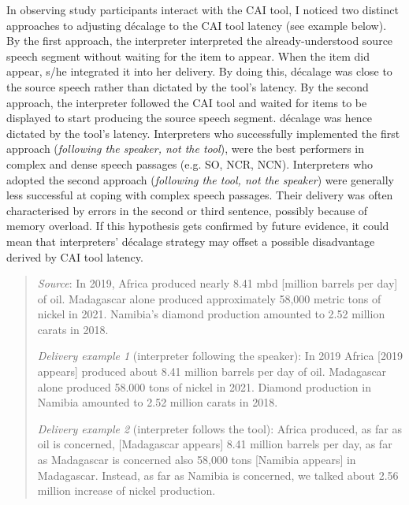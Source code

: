 In observing study participants interact with the CAI tool, I noticed two distinct approaches to adjusting décalage to the CAI tool latency (see example below). By the first approach, the interpreter interpreted the already-understood source speech segment without waiting for the item to appear. When the item did appear, s/he integrated it into her delivery. By doing this, décalage was close to the source speech rather than dictated by the tool’s latency. By the second approach, the interpreter followed the CAI tool and waited for items to be displayed to start producing the source speech segment. décalage was hence dictated by the tool’s latency. Interpreters who successfully implemented the first approach (\textit{following the speaker, not the tool}), were the best performers in complex and dense speech passages (e.g. SO, NCR, NCN). Interpreters who adopted the second approach (\textit{following the tool, not the speaker}) were generally less successful at coping with complex speech passages. Their delivery was often characterised by errors in the second or third sentence, possibly because of memory overload. If this hypothesis gets confirmed by future evidence, it could mean that interpreters’ décalage strategy may offset a possible disadvantage derived by CAI tool latency.

\begin{quote}
    \textit{Source}: In 2019, Africa produced nearly 8.41 mbd [million barrels per day] of oil. Madagascar alone produced approximately 58,000 metric tons of nickel in 2021. Namibia's diamond production amounted to 2.52 million carats in 2018.

\textit{Delivery example 1} (interpreter following the speaker): In 2019 Africa [2019 appears] produced about 8.41 million barrels per day of oil. Madagascar alone produced 58.000 tons of nickel in 2021. Diamond production in Namibia amounted to 2.52 million carats in 2018.

\textit{Delivery example 2} (interpreter follows the tool): Africa produced, as far as oil is concerned, [Madagascar appears] 8.41 million barrels per day, as far as Madagascar is concerned also 58,000 tons [Namibia appears] in Madagascar. Instead, as far as Namibia is concerned, we talked about 2.56 million increase of nickel production.
\end{quote}
